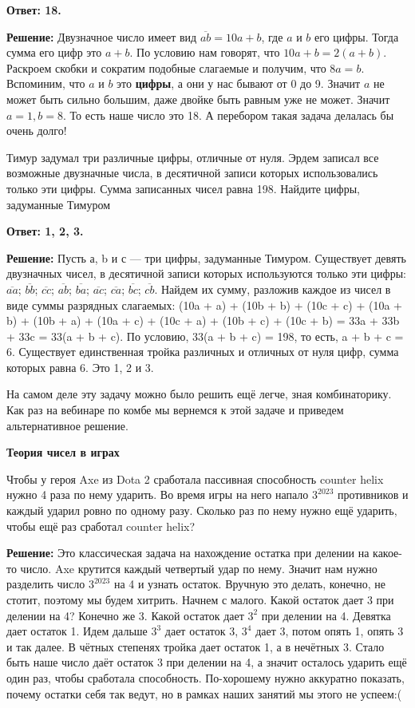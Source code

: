 \textbf{Ответ: 18.}

\textbf{Решение:} Двузначное число имеет 
 вид $\overline{ab}=10a+b$, где $a$ и $b$ его цифры. Тогда сумма его цифр это $a+b$. По условию нам говорят, что $10a+b=2(a+b)$. Раскроем скобки и сократим подобные слагаемые и получим, что $8a=b$. Вспоминим, что $a$ и $b$ это \textbf{цифры}, а они у нас бывают от 0 до 9. Значит $a$ не может быть сильно большим, даже двойке быть равным уже не может. Значит $a=1, b=8$. То есть наше число это 18. А перебором такая задача делалась бы очень долго!

 Тимур задумал три различные цифры, отличные от нуля. Эрдем записал все возможные двузначные числа, в десятичной записи которых использовались только эти цифры. Сумма записанных чисел равна 198. Найдите цифры, задуманные Тимуром
 
 \textbf{Ответ: 1, 2, 3.}

 \textbf{Решение:} Пусть а, b и с — три цифры, задуманные Тимуром. Существует девять двузначных чисел, в десятичной записи которых используются только эти цифры: $ \overline{aa}$; $ \overline{bb}$; $ \overline{cc}$; $ \overline{ab}$; $ \overline{ba}$; $ \overline{ac}$; $ \overline{ca}$; $ \overline{bc}$; $ \overline{cb}$. Найдем их сумму, разложив каждое из чисел в виде суммы разрядных слагаемых: (10a + a) + (10b + b) + (10c + c) + (10a + b) + (10b + a) + (10a + c) + (10c + a) + (10b + c) + (10c + b) = 33a + 33b + 33c = 33(a + b + c). По условию, 33(a + b + c) = 198, то есть, a + b + c = 6. Существует единственная тройка различных и отличных от нуля цифр, сумма которых равна 6. Это 1, 2 и 3.
 
 На самом деле эту задачу можно было решить ещё легче, зная комбинаторику. Как раз на вебинаре по комбе мы вернемся к этой задаче и приведем альтернативное решение.

 \textbf{\Large Теория чисел в играх}

 Чтобы у героя Axe из Dota 2 сработала пассивная способность counter helix нужно 4 раза по нему ударить. Во время игры на него напало $3^{2023}$ противников и каждый ударил ровно по одному разу. Сколько раз по нему нужно ещё ударить, чтобы ещё раз сработал counter helix?

 \textbf{Решение:} Это классическая задача на нахождение остатка при делении на какое-то число. Axe крутится каждый четвертый удар по нему. Значит нам нужно разделить число $3^{2023}$ на 4 и узнать остаток. Вручную это делать, конечно, не стотит, поэтому мы будем хитрить. Начнем с малого. Какой остаток дает 3 при делении на 4? Конечно же 3. Какой остаток дает $3^2$ при делении на 4. Девятка дает остаток 1. Идем дальше $3^3$ дает остаток 3, $3^4$ дает 3, потом опять 1, опять 3 и так далее. В чётных степенях тройка дает остаток 1, а в нечётных 3. Стало быть наше число даёт остаток 3 при делении на 4, а значит осталось ударить ещё один раз, чтобы сработала способность. По-хорошему нужно аккуратно показать, почему остатки себя так ведут, но в рамках наших занятий мы этого не успеем:(

